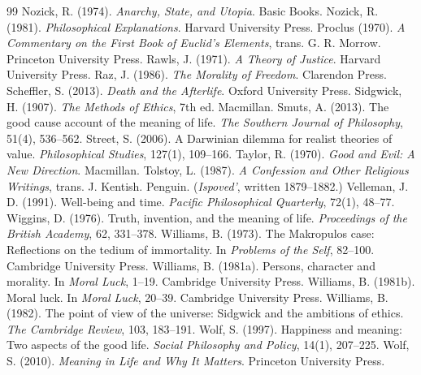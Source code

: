 \begin{thebibliography}{99}
 Nozick, R. (1974). \emph{Anarchy, State, and Utopia}. Basic Books.
 Nozick, R. (1981). \emph{Philosophical Explanations}. Harvard University Press.
 Proclus (1970). \emph{A Commentary on the First Book of Euclid's Elements}, trans. G. R. Morrow. Princeton University Press.
 Rawls, J. (1971). \emph{A Theory of Justice}. Harvard University Press.
 Raz, J. (1986). \emph{The Morality of Freedom}. Clarendon Press.
 Scheffler, S. (2013). \emph{Death and the Afterlife}. Oxford University Press.
 Sidgwick, H. (1907). \emph{The Methods of Ethics}, 7th ed. Macmillan.
 Smuts, A. (2013). The good cause account of the meaning of life. \emph{The Southern Journal of Philosophy}, 51(4), 536--562.
 Street, S. (2006). A Darwinian dilemma for realist theories of value. \emph{Philosophical Studies}, 127(1), 109--166.
 Taylor, R. (1970). \emph{Good and Evil: A New Direction}. Macmillan.
 Tolstoy, L. (1987). \emph{A Confession and Other Religious Writings}, trans. J. Kentish. Penguin. (\emph{Ispoved'}, written 1879--1882.)
 Velleman, J. D. (1991). Well-being and time. \emph{Pacific Philosophical Quarterly}, 72(1), 48--77.
 Wiggins, D. (1976). Truth, invention, and the meaning of life. \emph{Proceedings of the British Academy}, 62, 331--378.
 Williams, B. (1973). The Makropulos case: Reflections on the tedium of immortality. In \emph{Problems of the Self}, 82--100. Cambridge University Press.
 Williams, B. (1981a). Persons, character and morality. In \emph{Moral Luck}, 1--19. Cambridge University Press.
 Williams, B. (1981b). Moral luck. In \emph{Moral Luck}, 20--39. Cambridge University Press.
 Williams, B. (1982). The point of view of the universe: Sidgwick and the ambitions of ethics. \emph{The Cambridge Review}, 103, 183--191.
 Wolf, S. (1997). Happiness and meaning: Two aspects of the good life. \emph{Social Philosophy and Policy}, 14(1), 207--225.
 Wolf, S. (2010). \emph{Meaning in Life and Why It Matters}. Princeton University Press.
\end{thebibliography}
